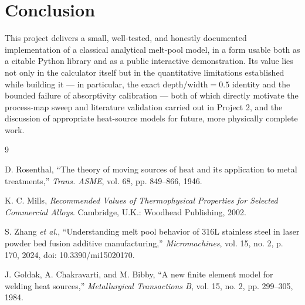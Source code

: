 \documentclass[10pt,journal]{IEEEtran}
\begin{document}
\section{Conclusion}

This project delivers a small, well-tested, and honestly documented implementation of a classical analytical melt-pool model, in a form usable both as a citable Python library and as a public interactive demonstration. Its value lies not only in the calculator itself but in the quantitative limitations established while building it --- in particular, the exact depth/width$=0.5$ identity and the bounded failure of absorptivity calibration --- both of which directly motivate the process-map sweep and literature validation carried out in Project 2, and the discussion of appropriate heat-source models for future, more physically complete work.

\begin{thebibliography}{9}

D. Rosenthal, ``The theory of moving sources of heat and its application to metal treatments,'' \textit{Trans. ASME}, vol. 68, pp. 849--866, 1946.

K. C. Mills, \textit{Recommended Values of Thermophysical Properties for Selected Commercial Alloys}. Cambridge, U.K.: Woodhead Publishing, 2002.

S. Zhang \textit{et al.}, ``Understanding melt pool behavior of 316L stainless steel in laser powder bed fusion additive manufacturing,'' \textit{Micromachines}, vol. 15, no. 2, p. 170, 2024, doi: 10.3390/mi15020170.

J. Goldak, A. Chakravarti, and M. Bibby, ``A new finite element model for welding heat sources,'' \textit{Metallurgical Transactions B}, vol. 15, no. 2, pp. 299--305, 1984.

\end{thebibliography}
\end{document}
